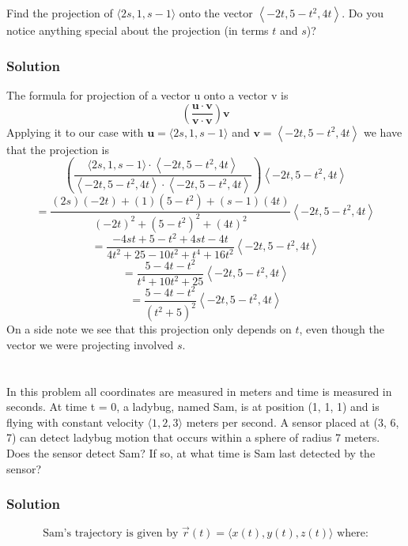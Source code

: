 \documentclass{article}
\begin{document}
\section{}
Find the projection of $\langle 2 s, 1, s-1\rangle$ onto the vector $\left\langle-2 t, 5-t^{2}, 4 t\right\rangle$. Do you notice anything special about the projection (in terms $t$ and $s$)?
\subsubsection*{Solution}
The formula for projection of a vector u onto a vector v is
$$
\left(\frac{\mathbf{u} \cdot \mathbf{v}}{\mathbf{v} \cdot \mathbf{v}}\right) \mathbf{v}
$$
Applying it to our case with $\mathbf{u}=\langle 2 s, 1, s-1\rangle$ and $\mathbf{v}=\left\langle-2 t, 5-t^{2}, 4 t\right\rangle$ we have
that the projection is
$$
\left(\frac{\langle 2 s, 1, s-1\rangle \cdot\left\langle-2 t, 5-t^{2}, 4 t\right\rangle}{\left\langle-2 t, 5-t^{2}, 4 t\right\rangle \cdot\left\langle-2 t, 5-t^{2}, 4 t\right\rangle}\right)\left\langle-2 t, 5-t^{2}, 4 t\right\rangle
$$
$$
=\frac{(2 s)(-2 t)+(1)\left(5-t^{2}\right)+(s-1)(4 t)}{(-2 t)^{2}+\left(5-t^{2}\right)^{2}+(4 t)^{2}}\left\langle-2 t, 5-t^{2}, 4 t\right\rangle
$$
$$
=\frac{-4 s t+5-t^{2}+4 s t-4 t}{4 t^{2}+25-10 t^{2}+t^{4}+16 t^{2}}\left\langle-2 t, 5-t^{2}, 4 t\right\rangle
$$
$$
=\frac{5-4 t-t^{2}}{t^{4}+10 t^{2}+25}\left\langle-2 t, 5-t^{2}, 4 t\right\rangle
$$
$$
\boxed{ =\frac{5-4 t-t^{2}}{\left(t^{2}+5\right)^{2}}\left\langle-2 t, 5-t^{2}, 4 t\right\rangle }
$$
On a side note we see that this projection only depends on $t$, even though the vector we were projecting involved $s$.

\section{}
In this problem all coordinates are measured in meters and time is measured in seconds. At time t = 0, a ladybug, named Sam, is at position (1, 1, 1) and is flying with constant
velocity $ \langle 1, 2, 3 \rangle $ meters per second. A sensor placed at (3, 6, 7) can detect ladybug motion that
occurs within a sphere of radius 7 meters. Does the sensor detect Sam? If so, at what time is
Sam last detected by the sensor?

\subsubsection*{Solution}

$$\text { Sam's trajectory is given by } \vec r (t)=\langle x(t), y(t), z(t)\rangle \text { where: } $$
\end{document}
